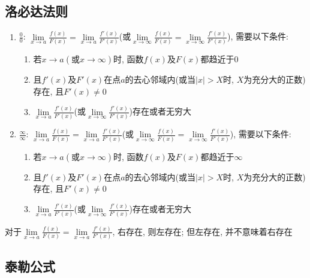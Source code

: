 \subsection{洛必达法则}\label{洛必达法则}
\begin{enumerate}
\item $ \frac{0}{0} $: $ \lim\limits_{x\rightarrow a}\frac{f(x)}{F(x)}=\lim\limits_{x\rightarrow a}\frac{f'(x)}{F'(x)} $(或$ \lim\limits_{x\rightarrow \infty}\frac{f(x)}{F(x)}=\lim\limits_{x\rightarrow \infty}\frac{f'(x)}{F'(x)} $), 需要以下条件:
\begin{enumerate}
\item 若$ x\rightarrow a(\text{或}x\rightarrow \infty) $时, 函数$ f(x) $及$ F(x) $都趋近于$ 0 $
\item 且$ f'(x) $及$ F'(x) $在点$ a $的去心邻域内(或当$ |x|>X $时, $ X $为充分大的正数)存在, 且$ F'(x)\neq 0 $
\item $ \lim\limits_{x\rightarrow a}\frac{f'(x)}{F'(x)} $(或$ \lim\limits_{x\rightarrow \infty}\frac{f'(x)}{F'(x)} $)存在或者无穷大
\end{enumerate}
\item $ \frac{\infty}{\infty} $: $ \lim\limits_{x\rightarrow a}\frac{f(x)}{F(x)}=\lim\limits_{x\rightarrow a}\frac{f'(x)}{F'(x)} $(或$ \lim\limits_{x\rightarrow \infty}\frac{f(x)}{F(x)}=\lim\limits_{x\rightarrow \infty}\frac{f'(x)}{F'(x)} $), 需要以下条件:
\begin{enumerate}
\item 若$ x\rightarrow a(\text{或}x\rightarrow \infty) $时, 函数$ f(x) $及$ F(x) $都趋近于$ \infty $
\item 且$ f'(x) $及$ F'(x) $在点$ a $的去心邻域内(或当$ |x|>X $时, $ X $为充分大的正数)存在, 且$ F'(x)\neq 0 $
\item $ \lim\limits_{x\rightarrow a}\frac{f'(x)}{F'(x)} $(或$ \lim\limits_{x\rightarrow \infty}\frac{f'(x)}{F'(x)} $)存在或者无穷大
\end{enumerate}
\end{enumerate}
\begin{tcolorbox}
对于$ \lim\limits_{x\rightarrow a}\frac{f(x)}{F(x)}=\lim\limits_{x\rightarrow a}\frac{f'(x)}{F'(x)} $, 右存在, 则左存在; 但左存在, 并不意味着右存在
\end{tcolorbox}
\subsection{泰勒公式}
